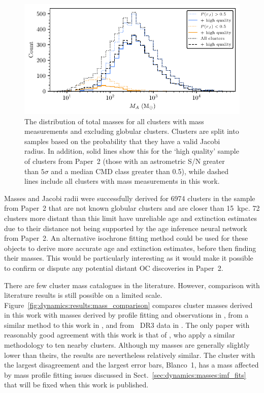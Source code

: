\begin{figure}[t]
    \centering
    \includegraphics[width=\textwidth]{fig/c4/results_mass_distribution.pdf}
    \caption[The distribution of total masses for all clusters with mass measurements]{The distribution of total masses for all clusters with mass measurements and excluding globular clusters. Clusters are split into samples based on the probability that they have a valid Jacobi radius. In addition, solid lines show this for the `high quality' sample of clusters from Paper~2 (those with an astrometric S/N greater than $5\sigma$ and a median CMD class greater than 0.5), while dashed lines include all clusters with mass measurements in this work.}
    \label{fig:dynamics:results:mass_distribution}
\end{figure}

Masses and Jacobi radii were successfully derived for 6974 clusters in the sample from Paper~2 that are not known globular clusters and are closer than 15~kpc. 72 clusters more distant than this limit have unreliable age and extinction estimates due to their distance not being supported by the age inference neural network from Paper~2. An alternative isochrone fitting method could be used for these objects to derive more accurate age and extinction estimates, before then finding their masses. This would be particularly interesting as it would make it possible to confirm or dispute any potential distant OC discoveries in Paper~2.

There are few cluster mass catalogues in the literature. However, comparison with literature results is still possible on a limited scale. Figure~\ref{fig:dynamics:results:mass_comparison} compares cluster masses derived in this work with masses derived by profile fitting and observations in \cite{piskunov_tidal_2008}, from a similar method to this work in \cite{meingast_extended_2021}, and from \gaia\ DR3 data in \cite{cordoni_photometric_binaries_2023}. The only paper with reasonably good agreement with this work is that of \cite{meingast_extended_2021}, who apply a similar methodology to ten nearby clusters. Although my masses are generally slightly lower than theirs, the results are nevertheless relatively similar. The cluster with the largest disagreement and the largest error bars, Blanco~1, has a mass affected by mass profile fitting issues discussed in Sect.~\ref{sec:dynamics:masses:imf_fits} that will be fixed when this work is published.

